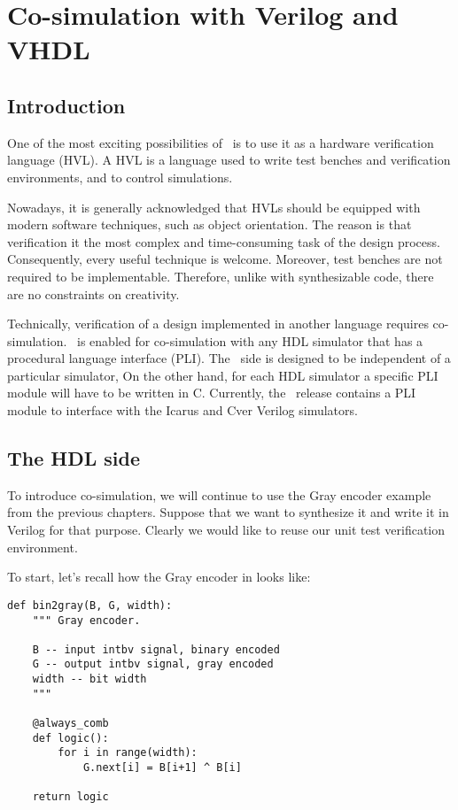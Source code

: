 \chapter{Co-simulation with Verilog and VHDL \label{cosim}}

\section{Introduction \label{cosim-intro}}

One of the most exciting possibilities of \myhdl\
is to use it as a hardware verification language (HVL).
A HVL is a language used to write test benches and
verification environments, and to control simulations.

Nowadays, it is generally acknowledged that HVLs should be equipped
with modern software techniques, such as object orientation. The
reason is that verification it the most complex and time-consuming
task of the design process. Consequently, every useful technique is
welcome. Moreover, test benches are not required to be
implementable. Therefore, unlike with synthesizable code, there
are no constraints on creativity.

Technically, verification of a design implemented in
another language requires co-simulation. \myhdl\ is 
enabled for co-simulation with any HDL simulator that
has a procedural language interface (PLI). The \myhdl\
side is designed to be independent of a particular
simulator, On the other hand, for each HDL simulator a specific
PLI module will have to be written in C. Currently,
the \myhdl\ release contains a PLI module to interface
with the Icarus and Cver Verilog simulators.

\section{The HDL side \label{cosim-hdl}}

To introduce co-simulation, we will continue to use the Gray encoder
example from the previous chapters. Suppose that we want to
synthesize it and write it in Verilog for that purpose. Clearly we would
like to reuse our unit test verification environment. 

To start, let's recall how the Gray encoder in \myhdl{} looks like:

\begin{verbatim}
def bin2gray(B, G, width):
    """ Gray encoder.

    B -- input intbv signal, binary encoded
    G -- output intbv signal, gray encoded
    width -- bit width
    """

    @always_comb
    def logic():
        for i in range(width):
            G.next[i] = B[i+1] ^ B[i]

    return logic
\end{verbatim}

